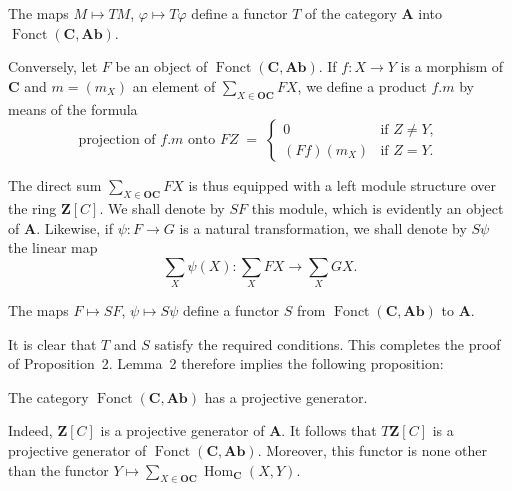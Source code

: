 \begin{lemma}
The maps $M\mapsto TM$, $\varphi\mapsto T\varphi$ define a functor $T$ of
the category $\mathbf{A}$ into $\operatorname{Fonct}(\mathbf{C},\mathbf{Ab})$.
\end{lemma}

Conversely, let $F$ be an object of
$\operatorname{Fonct}(\mathbf{C},\mathbf{Ab})$. If $f\colon X\to Y$ is a
morphism of $\mathbf{C}$ and $m = (m_X)$ an element of
$\sum_{X\in\mathbf{OC}}FX$, we define a product $f.m$ by means of the formula
\[
  \text{projection of } f.m \text{ onto } FZ
  \;=\;
  \begin{cases}
    0            & \text{if } Z \neq Y,\\
    (Ff)(m_X)    & \text{if } Z = Y.
  \end{cases}
\]

The direct sum $\sum_{X\in\mathbf{OC}}FX$ is thus equipped with a
left module structure over the ring $\mathbf{Z}[C]$. We shall denote by
$SF$ this module, which is evidently an object of $\mathbf{A}$.
Likewise, if $\psi\colon F\to G$ is a natural transformation, we shall
denote by $S\psi$ the linear map
\[
  \sum_X\psi(X)\colon \sum_X FX\to \sum_X GX.
\]

\begin{lemma}
The maps $F\mapsto SF$, $\psi\mapsto S\psi$ define a functor $S$ from
$\operatorname{Fonct}(\mathbf{C},\mathbf{Ab})$ to $\mathbf{A}$.
\end{lemma}

It is clear that $T$ and $S$ satisfy the required conditions. This
completes the proof of Proposition~2. Lemma~2 therefore implies the
following proposition:

\begin{proposition}
The category $\operatorname{Fonct}(\mathbf{C},\mathbf{Ab})$ has a
projective generator.
\end{proposition}

Indeed, $\mathbf{Z}[C]$ is a projective generator of $\mathbf{A}$. It
follows that $T\mathbf{Z}[C]$ is a projective generator of
$\operatorname{Fonct}(\mathbf{C},\mathbf{Ab})$. Moreover, this functor is
none other than the functor
$Y\mapsto \sum_{X\in\mathbf{OC}}\operatorname{Hom}_{\mathbf{C}}(X,Y)$.